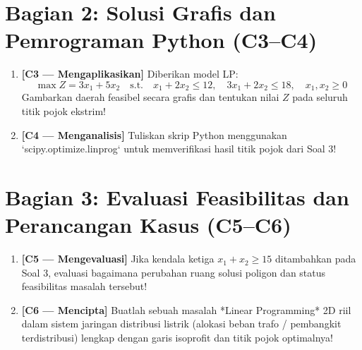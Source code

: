 \documentclass[11pt,a4paper]{article}
\begin{document}
\section*{Bagian 2: Solusi Grafis dan Pemrograman Python (C3--C4)}

\begin{enumerate}[label=\textbf{Soal \arabic*:}, leftmargin=*, resume]
    \item \textbf{[C3 --- Mengaplikasikan]} Diberikan model LP:
    \[
        \max Z = 3 x_1 + 5 x_2 \quad \text{s.t.} \quad x_1 + 2 x_2 \le 12, \quad 3 x_1 + 2 x_2 \le 18, \quad x_1, x_2 \ge 0
    \]
    Gambarkan daerah feasibel secara grafis dan tentukan nilai $Z$ pada seluruh titik pojok ekstrim!
    
    \begin{tcolorbox}[colback=white,colframe=gray!50,height=5cm,title=Ruang Jawaban Soal 3]
    \end{tcolorbox}

    \item \textbf{[C4 --- Menganalisis]} Tuliskan skrip Python menggunakan `scipy.optimize.linprog` untuk memverifikasi hasil titik pojok dari Soal 3!
    
    \begin{tcolorbox}[colback=white,colframe=gray!50,height=5.5cm,title=Ruang Jawaban Soal 4]
    \end{tcolorbox}
\end{enumerate}

\section*{Bagian 3: Evaluasi Feasibilitas dan Perancangan Kasus (C5--C6)}

\begin{enumerate}[label=\textbf{Soal \arabic*:}, leftmargin=*, resume]
    \item \textbf{[C5 --- Mengevaluasi]} Jika kendala ketiga $x_1 + x_2 \ge 15$ ditambahkan pada Soal 3, evaluasi bagaimana perubahan ruang solusi poligon dan status feasibilitas masalah tersebut!
    
    \begin{tcolorbox}[colback=white,colframe=gray!50,height=4.5cm,title=Ruang Jawaban Soal 5]
    \end{tcolorbox}

    \item \textbf{[C6 --- Mencipta]} Buatlah sebuah masalah *Linear Programming* 2D riil dalam sistem jaringan distribusi listrik (alokasi beban trafo / pembangkit terdistribusi) lengkap dengan garis isoprofit dan titik pojok optimalnya!
    
    \begin{tcolorbox}[colback=white,colframe=gray!50,height=6.5cm,title=Ruang Jawaban Soal 6]
    \end{tcolorbox}
\end{enumerate}
\end{document}
